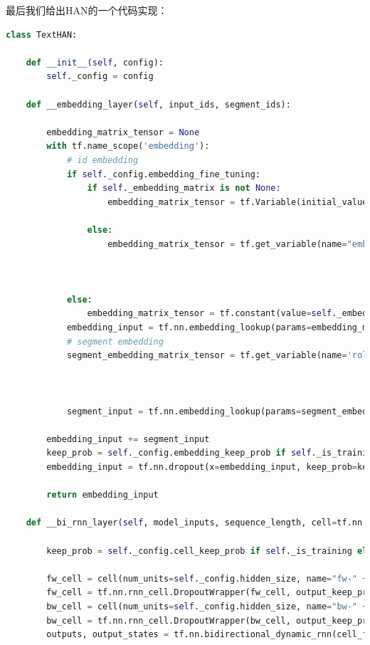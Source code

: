 \documentclass[twoside,a4paper,12pt]{book}%
\begin{document}
最后我们给出\gls{HAN}的一个代码实现：
\begin{lstlisting}[language={Python}]
class TextHAN:

	def __init__(self, config):
		self._config = config

	def __embedding_layer(self, input_ids, segment_ids):

		embedding_matrix_tensor = None
		with tf.name_scope('embedding'):
			# id embedding
			if self._config.embedding_fine_tuning:
				if self._embedding_matrix is not None:
					embedding_matrix_tensor = tf.Variable(initial_value=self._embedding_matrix,
																								dtype=tf.float32, name="embeddings")
				else:
					embedding_matrix_tensor = tf.get_variable(name="embeddings",
																										dtype=tf.float32,
																										shape=[self._config.vocab_size, self._config.embedding_size],
																										initializer=self._initializer)
			else:
				embedding_matrix_tensor = tf.constant(value=self._embedding_matrix, dtype=tf.float32, name="embeddings")
			embedding_input = tf.nn.embedding_lookup(params=embedding_matrix_tensor, ids=input_ids)
			# segment embedding
			segment_embedding_matrix_tensor = tf.get_variable(name='role_embedding',
																												dtype=tf.float32,
																												shape=[self._config.segment_size, self._config.embedding_size],
																												initializer=self._initializer)
			segment_input = tf.nn.embedding_lookup(params=segment_embedding_matrix_tensor, ids=segment_ids)

		embedding_input += segment_input
		keep_prob = self._config.embedding_keep_prob if self._is_training else 1.0
		embedding_input = tf.nn.dropout(x=embedding_input, keep_prob=keep_prob)

		return embedding_input

	def __bi_rnn_layer(self, model_inputs, sequence_length, cell=tf.nn.rnn_cell.BasicLSTMCell, scope_name="none"):

		keep_prob = self._config.cell_keep_prob if self._is_training else 1.0

		fw_cell = cell(num_units=self._config.hidden_size, name="fw-" + scope_name)
		fw_cell = tf.nn.rnn_cell.DropoutWrapper(fw_cell, output_keep_prob=keep_prob)
		bw_cell = cell(num_units=self._config.hidden_size, name="bw-" + scope_name)
		bw_cell = tf.nn.rnn_cell.DropoutWrapper(bw_cell, output_keep_prob=keep_prob)
		outputs, output_states = tf.nn.bidirectional_dynamic_rnn(cell_fw=fw_cell,
																														 cell_bw=bw_cell,
																														 dtype=tf.float32,
																														 inputs=model_inputs,
																														 sequence_length=sequence_length)


\end{lstlisting}
\end{document}
